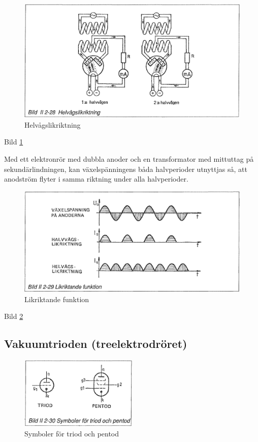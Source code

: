 \begin{figure}
\includegraphics[width=\textwidth]{images/bild_2_2-28}
\caption{Helvågslikriktning}
\label{fig:BildII2-28}
\end{figure}

Bild \ref{fig:BildII2-28}

Med ett elektronrör med dubbla anoder och en transformator med mittuttag på
sekundärlindningen, kan växelspänningens båda halvperioder utnyttjas så, att
anodström flyter i samma riktning under alla halvperioder.

\begin{figure}
\includegraphics[width=\textwidth]{images/bild_2_2-29}
\caption{Likriktande funktion}
\label{fig:BildII2-29}
\end{figure}

Bild \ref{fig:BildII2-29}

\subsection{Vakuumtrioden (treelektrodröret)}

\begin{figure}
\includegraphics[width=0.5\textwidth]{images/bild_2_2-30}
\caption{Symboler för triod och pentod}
\label{fig:BildII2-30}
\end{figure}

